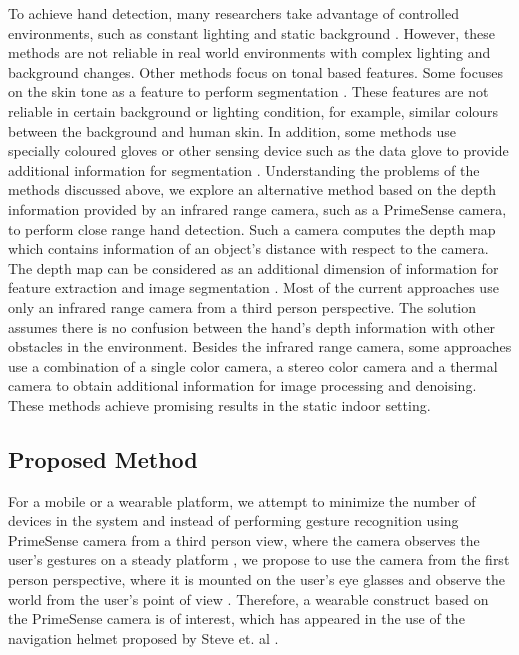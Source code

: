 \documentclass[conference]{IEEEtran}
\begin{document}
To achieve hand detection, many researchers take advantage of controlled environments, such as constant lighting and static background \cite{imagawa1998color, hong2000gesture}. However, these methods are not reliable in real world environments with complex lighting and background changes. Other methods focus on tonal based features. Some focuses on the skin tone as a feature to perform segmentation \cite{kjeldsen1996toward}. These features are not reliable in certain background or lighting condition, for example, similar colours between the background and human skin. In addition, some methods use specially coloured gloves or other sensing device such as the data glove to provide additional information for segmentation \cite{sturman1994survey}. Understanding the problems of the methods discussed above, we explore an alternative method based on the depth information provided by an infrared range camera, such as a PrimeSense camera, to perform close range hand detection. %
Such a camera computes the depth map which contains information of an object's distance with respect to the camera. The depth map can be considered as an additional dimension of information for feature extraction and image segmentation \cite{ren2011robust, uebersax2011real}. Most of the current approaches use only an infrared range camera from a third person perspective. The solution assumes there is no confusion between the hand’s depth information with other obstacles in the environment. Besides the infrared range camera, some approaches use a combination of a single color camera, a stereo color camera and a thermal camera to obtain additional information for image processing and denoising\cite{appenrodt2010data}. These methods achieve promising results in the static indoor setting.

\subsection{Proposed Method}
For a mobile or a wearable platform, we attempt to minimize the number of devices in the system and instead of performing gesture recognition using PrimeSense camera from a third person view, where the camera observes the user’s gestures on a steady platform \cite{li2009real}, we propose to use the camera from the first person perspective, where it is mounted on the user's eye glasses and observe the world from the user's point of view \cite{mann2011blind}. Therefore, a wearable construct based on the PrimeSense camera is of interest, which has appeared in the use of the navigation helmet proposed by Steve et. al \cite{mann2011blind}.
\end{document}
